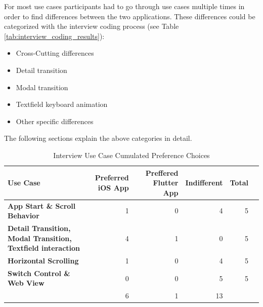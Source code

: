 For most use cases participants had to go through use cases multiple times in order to find differences between the two applications.
These differences could be categorized with the interview coding process (see Table \ref{tab:interview_coding_results}):
\begin{itemize}
    \item Cross-Cutting differences
    \item Detail transition
    \item Modal transition
    \item Textfield keyboard animation
    \item Other specific differences
\end{itemize}
The following sections explain the above categories in detail.

\begin{table}[!htp]\centering
    \caption{Interview Use Case Cumulated Preference Choices}\label{tab:interview_use_case_preferences}
    \scriptsize
    \begin{tabular}{lrrrrr}\toprule
    \textbf{Use Case} &\textbf{Preferred iOS App} &\textbf{Preffered Flutter App} &\textbf{Indifferent} &\textbf{Total} \\\midrule
    \textbf{App Start \& Scroll Behavior} &1 &0 &4 &5 \\
    \textbf{Detail Transition, Modal Transition, Textfield interaction} &4 &1 &0 &5 \\
    \textbf{Horizontal Scrolling} &1 &0 &4 &5 \\
    \textbf{Switch Control \& Web View} &0 &0 &5 &5 \\
    &6 &1 &13 & \\
    \bottomrule
    \end{tabular}
\end{table}




